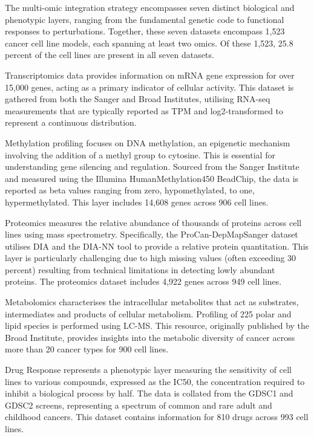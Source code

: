 The multi-omic integration strategy encompasses seven distinct biological and phenotypic layers, ranging from the fundamental genetic code to functional responses to perturbations. Together, these seven datasets encompass 1,523 cancer cell line models, each spanning at least two omics. Of these 1,523, 25.8 percent of the cell lines are present in all seven datasets.

Transcriptomics data provides information on mRNA gene expression for over 15,000 genes, acting as a primary indicator of cellular activity. This dataset is gathered from both the Sanger and Broad Institutes, utilising RNA-seq measurements that are typically reported as \gls{TPM} and log2-transformed to represent a continuous distribution.

Methylation profiling focuses on DNA methylation, an epigenetic mechanism involving the addition of a methyl group to cytosine. This is essential for understanding gene silencing and regulation. Sourced from the Sanger Institute and measured using the Illumina HumanMethylation450 BeadChip, the data is reported as beta values ranging from zero, hypomethylated, to one, hypermethylated. This layer includes 14,608 genes across 906 cell lines.

Proteomics measures the relative abundance of thousands of proteins across cell lines using mass spectrometry. Specifically, the ProCan-DepMapSanger dataset utilises \gls{DIA} and the DIA-NN tool to provide a relative protein quantitation. This layer is particularly challenging due to high missing values (often exceeding 30 percent) resulting from technical limitations in detecting lowly abundant proteins. The proteomics dataset includes 4,922 genes across 949 cell lines.

Metabolomics characterises the intracellular metabolites that act as substrates, intermediates and products of cellular metabolism. Profiling of 225 polar and lipid species is performed using \gls{LC-MS}. This resource, originally published by the Broad Institute, provides insights into the metabolic diversity of cancer across more than 20 cancer types for 900 cell lines.

Drug Response represents a phenotypic layer measuring the sensitivity of cell lines to various compounds, expressed as the \gls{IC50}, the concentration required to inhibit a biological process by half. The data is collated from the GDSC1 and GDSC2 screens, representing a spectrum of common and rare adult and childhood cancers. This dataset contains information for 810 drugs across 993 cell lines.

